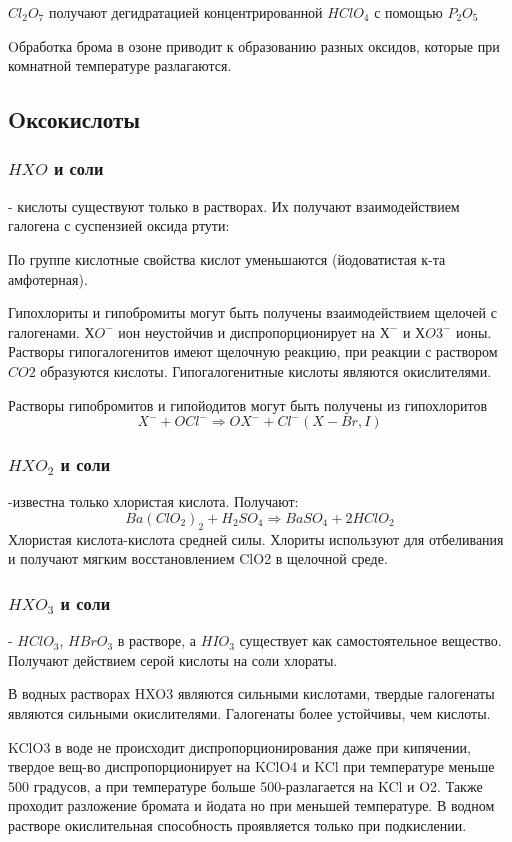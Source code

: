 \documentclass[11pt]{article}
\begin{document}
$Cl_2O_7$ получают дегидратацией концентрированной $HClO_4$ с помощью $P_2O_5$

Oбработка брома в озоне приводит к образованию разных оксидов, которые при комнатной температуре разлагаются.

\subsection{Oксокислоты}
\subsubsection{$HXO$ и соли}- кислоты существуют только в растворах. Их получают взаимодействием галогена с суспензией оксида ртути:

По группе кислотные свойства кислот уменьшаются (йодоватистая к-та
амфотерная).

Гипохлориты и гипобромиты могут быть получены взаимодействием щелочей с
галогенами. $ХO^-$ ион неустойчив и диспропорционирует на $Х^-$ и $ХO3^-$ ионы. Растворы
гипогалогенитов имеют щелочную реакцию, при реакции с раствором $CO2$
образуются кислоты. Гипогалогенитные кислоты являются окислителями.

Растворы гипобромитов и гипойодитов могут быть получены из гипохлоритов $$X^-+OCl^- \Rightarrow OX^-+Cl^- (X-Br, I)$$

\subsubsection{$HXO_2$ и соли}-известна только хлористая кислота. Получают:
$$Ba(ClO_2)_2+H_2SO_4\Rightarrow BaSO_4+2HClO_2$$
Хлористая кислота-кислота средней силы. Хлориты используют для отбеливания и
получают мягким восстановлением ClO2 в щелочной среде.

\subsubsection{$HXO_3$ и соли}- $HClO_3$, $HBrO_3$ в растворе, а $HIO_3$ существует как
самостоятельное вещество. Получают действием серой кислоты на соли хлораты.

В водных растворах HXO3 являются сильными кислотами, твердые галогенаты
являются сильными окислителями. Галогенаты более устойчивы, чем кислоты.

KClO3 в воде не происходит диспропорционирования даже при кипячении, твердое
вещ-во диспропорционирует на KClO4 и KCl при температуре меньше 500 градусов,
а при температуре больше 500-разлагается на KCl и O2. 
Также проходит разложение бромата и йодата но при меньшей температуре. В водном растворе
окислительная способность проявляется только при подкислении.
\end{document}
